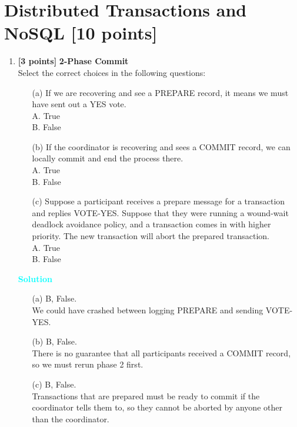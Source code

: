 \documentclass[10pt]{article}
\newenvironment{solution}
    { \begin{mdframed}[backgroundcolor=gray!10] \textcolor{cyan}{\textbf{Solution}} \\}
    {  \end{mdframed}}
\begin{document}
\newpage
\section{Distributed Transactions and NoSQL \textbf{[10 points]}}

\begin{enumerate}
	\item \textbf{[3 points]} \textbf{2-Phase Commit} \\
	      Select the correct choices in the following questions: \\
	      \begin{itemize}
		      \item[(a)] If we are recovering and see a PREPARE record, it means we must have sent out a YES vote. \\
		            A. True \\
		            B. False
		      \item[(b)] If the coordinator is recovering and sees a COMMIT record, we can locally commit and end the process there. \\
		            A. True \\
		            B. False
		      \item[(c)] Suppose a participant receives a prepare message for a transaction and replies VOTE-YES.
		            Suppose that they were running a wound-wait deadlock avoidance policy, and a transaction
		            comes in with higher priority. The new transaction will abort the prepared transaction. \\
		            A. True \\
		            B. False
	      \end{itemize}
	      \begin{solution}
		      \begin{itemize}
			      \item[(a)] B, False. \\
			            We could have crashed between logging PREPARE and sending VOTE-YES.
			      \item[(b)] B, False. \\
			            There is no guarantee that all participants received a COMMIT record, so we must rerun phase 2 first.
			      \item[(c)] B, False. \\
			            Transactions that are prepared must be ready to commit if the coordinator tells them
			            to, so they cannot be aborted by anyone other than the coordinator.
		      \end{itemize}
	      \end{solution}


\end{enumerate}
\end{document}
